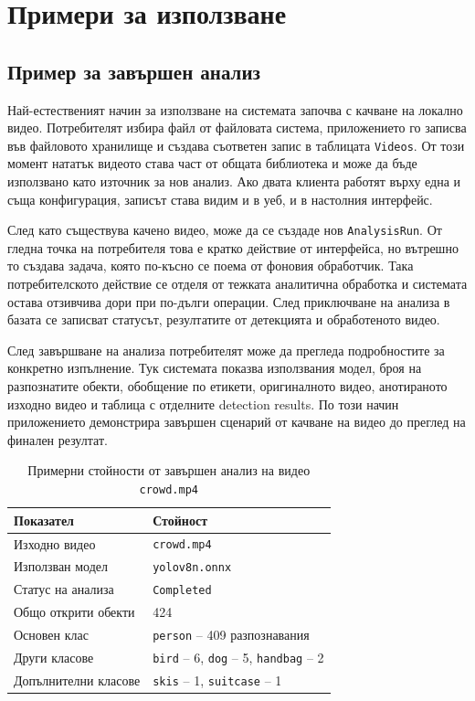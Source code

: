 \chapter{Примери за използване}

\section{Пример за завършен анализ}

Най-естественият начин за използване на системата започва с качване на локално видео. Потребителят избира файл от файловата система, приложението го записва във файловото хранилище и създава съответен запис в таблицата \texttt{Videos}. От този момент нататък видеото става част от общата библиотека и може да бъде използвано като източник за нов анализ. Ако двата клиента работят върху една и съща конфигурация, записът става видим и в уеб, и в настолния интерфейс.

След като съществува качено видео, може да се създаде нов \texttt{AnalysisRun}. От гледна точка на потребителя това е кратко действие от интерфейса, но вътрешно то създава задача, която по-късно се поема от фоновия обработчик. Така потребителското действие се отделя от тежката аналитична обработка и системата остава отзивчива дори при по-дълги операции. След приключване на анализа в базата се записват статусът, резултатите от детекцията и обработеното видео.

След завършване на анализа потребителят може да прегледа подробностите за конкретно изпълнение. Тук системата показва използвания модел, броя на разпознатите обекти, обобщение по етикети, оригиналното видео, анотираното изходно видео и таблица с отделните detection results. По този начин приложението демонстрира завършен сценарий от качване на видео до преглед на финален резултат.

\begin{table}[htbp]
\centering
\begin{tabular}{ll}
\toprule
Показател & Стойност \\
\midrule
Изходно видео & \texttt{crowd.mp4} \\
Използван модел & \texttt{yolov8n.onnx} \\
Статус на анализа & \texttt{Completed} \\
Общо открити обекти & 424 \\
Основен клас & \texttt{person} -- 409 разпознавания \\
Други класове & \texttt{bird} -- 6, \texttt{dog} -- 5, \texttt{handbag} -- 2 \\
Допълнителни класове & \texttt{skis} -- 1, \texttt{suitcase} -- 1 \\
\bottomrule
\end{tabular}
\caption{Примерни стойности от завършен анализ на видео \texttt{crowd.mp4}}
\label{tab:crowd-analysis-results}
\end{table}


